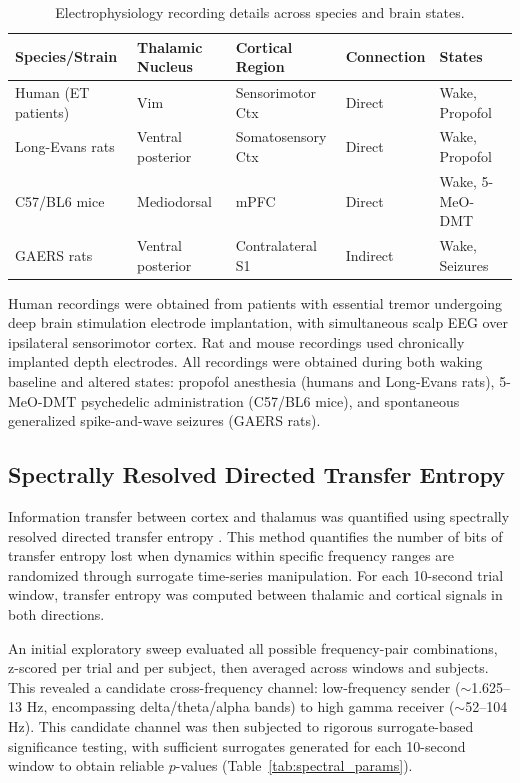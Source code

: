 \documentclass[12pt]{article}
\begin{document}
\begin{table}[H]
\centering
\caption{Electrophysiology recording details across species and brain states.}
\label{tab:recordings}
\begin{tabular}{lllll}
\toprule
Species/Strain & Thalamic Nucleus & Cortical Region & Connection & States \\
\midrule
Human (ET patients) & Vim & Sensorimotor Ctx & Direct & Wake, Propofol \\
Long-Evans rats & Ventral posterior & Somatosensory Ctx & Direct & Wake, Propofol \\
C57/BL6 mice & Mediodorsal & mPFC & Direct & Wake, 5-MeO-DMT \\
GAERS rats & Ventral posterior & Contralateral S1 & Indirect & Wake, Seizures \\
\bottomrule
\end{tabular}
\end{table}

Human recordings were obtained from patients with essential tremor undergoing deep brain stimulation electrode implantation, with simultaneous scalp EEG over ipsilateral sensorimotor cortex. Rat and mouse recordings used chronically implanted depth electrodes. All recordings were obtained during both waking baseline and altered states: propofol anesthesia (humans and Long-Evans rats), 5-MeO-DMT psychedelic administration (C57/BL6 mice), and spontaneous generalized spike-and-wave seizures (GAERS rats).

\subsection{Spectrally Resolved Directed Transfer Entropy}

Information transfer between cortex and thalamus was quantified using spectrally resolved directed transfer entropy \citep{schreiber2000measuring}. This method quantifies the number of bits of transfer entropy lost when dynamics within specific frequency ranges are randomized through surrogate time-series manipulation. For each 10-second trial window, transfer entropy was computed between thalamic and cortical signals in both directions.

An initial exploratory sweep evaluated all possible frequency-pair combinations, z-scored per trial and per subject, then averaged across windows and subjects. This revealed a candidate cross-frequency channel: low-frequency sender ($\sim$1.625--13 Hz, encompassing delta/theta/alpha bands) to high gamma receiver ($\sim$52--104 Hz). This candidate channel was then subjected to rigorous surrogate-based significance testing, with sufficient surrogates generated for each 10-second window to obtain reliable $p$-values (Table~\ref{tab:spectral_params}).
\end{document}
